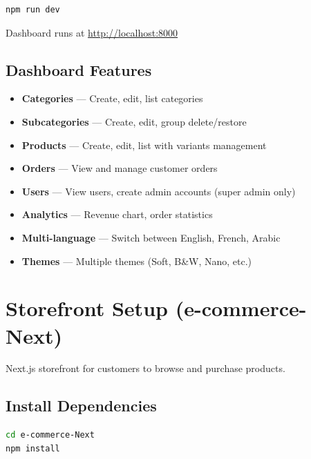\documentclass[12pt,a4paper]{article}
\begin{document}
\begin{lstlisting}[language=bash, caption=Start dashboard]
npm run dev
\end{lstlisting}

\begin{tcolorbox}[colback=green!5!white,colframe=successgreen]
    Dashboard runs at \url{http://localhost:8000}
\end{tcolorbox}

\subsection{Dashboard Features}

\begin{itemize}
    \item \textbf{Categories} — Create, edit, list categories
    \item \textbf{Subcategories} — Create, edit, group delete/restore
    \item \textbf{Products} — Create, edit, list with variants management
    \item \textbf{Orders} — View and manage customer orders
    \item \textbf{Users} — View users, create admin accounts (super admin only)
    \item \textbf{Analytics} — Revenue chart, order statistics
    \item \textbf{Multi-language} — Switch between English, French, Arabic
    \item \textbf{Themes} — Multiple themes (Soft, B\&W, Nano, etc.)
\end{itemize}

\newpage

\section{Storefront Setup (e-commerce-Next)}

Next.js storefront for customers to browse and purchase products.

\subsection{Install Dependencies}

\begin{lstlisting}[language=bash, caption=Install storefront packages]
cd e-commerce-Next
npm install
\end{lstlisting}
\end{document}
